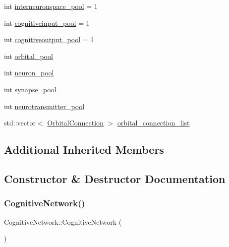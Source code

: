 \begin{DoxyCompactItemize}
\item 
int \mbox{\hyperlink{classCognitiveNetwork_a9ac40480942ca8287c09533a6e5997cd}{interneuronspace\+\_\+pool}} = 1
\item 
int \mbox{\hyperlink{classCognitiveNetwork_ad17a9880d3e4742cc4f2151d76b5e906}{cognitiveinput\+\_\+pool}} = 1
\item 
int \mbox{\hyperlink{classCognitiveNetwork_aabdf601ef8d8827cfeeacdc72fa85d37}{cognitiveoutput\+\_\+pool}} = 1
\item 
int \mbox{\hyperlink{classCognitiveNetwork_a58920f62f4c0dc71bb62b1480c78a356}{orbital\+\_\+pool}}
\item 
int \mbox{\hyperlink{classCognitiveNetwork_a8873930c11fbe7e1c8f1850961cc73ec}{neuron\+\_\+pool}}
\item 
int \mbox{\hyperlink{classCognitiveNetwork_acce7f5451dd50c27689d2239fbd66394}{synapse\+\_\+pool}}
\item 
int \mbox{\hyperlink{classCognitiveNetwork_a8fdef3aed1bd95b0980885c77f423a12}{neurotransmitter\+\_\+pool}}
\item 
std\+::vector$<$ \mbox{\hyperlink{structCognitiveNetwork_1_1OrbitalConnection}{Orbital\+Connection}} $>$ \mbox{\hyperlink{classCognitiveNetwork_aaae2978be9a9acb8d7ff0de6495ec9b0}{orbital\+\_\+connection\+\_\+list}}
\end{DoxyCompactItemize}
\subsection*{Additional Inherited Members}


\subsection{Constructor \& Destructor Documentation}
\mbox{\label{classCognitiveNetwork_a3daddb316744336648d317e7f71ed371}} 
\subsubsection{\texorpdfstring{Cognitive\+Network()}{CognitiveNetwork()}\hspace{0.1cm}{\footnotesize\ttfamily [1/4]}}
{\footnotesize\ttfamily Cognitive\+Network\+::\+Cognitive\+Network (\begin{DoxyParamCaption}{ }\end{DoxyParamCaption})\hspace{0.3cm}{\ttfamily [inline]}}


